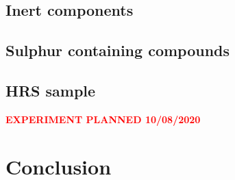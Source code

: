 \subsection{Inert components}



\subsection{Sulphur containing compounds}

\subsection{HRS sample}
\centerline{\textcolor{red}{\textbf{EXPERIMENT PLANNED 10/08/2020}}}

\section{Conclusion}

